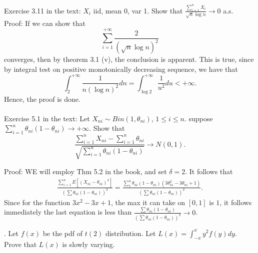 \documentclass[11pt]{article} \pagestyle{plain}
\def\beq{\begin{equation}}
\def\eeq{\end{equation}}
\begin{document}
\noindent Exercise 3.11 in the text: $X_{i}$ iid, mean 0, var 1. Show that $\frac{\sum_{i=1}^{n}X_{i}}{\sqrt{n}\log{n}} \to 0$ a.s.\\

\noindent Proof: If we can show that \beq \sum_{i=1}^{+\infty}\frac{2}{(\sqrt{n}\log{n})^{2}}\eeq converges, then by theorem 3.1 (v), the conclusion is apparent. This is true, since by integral test on positive monotonically decreasing sequence, we have that 
\beq \int_{2}^{+\infty}\frac{1}{n(\log{n})^{2}}dn = \int_{\log{2}}^{+\infty}\frac{1}{u^{2}}du< +\infty.\eeq
Hence, the proof is done.\\\\

\noindent Exercise 5.1 in the text: Let $X_{ni}\sim Bin(1,\theta_{ni})$, $1\leq i\leq n$. suppose $\sum_{i=1}^{n}\theta_{ni}(1-\theta_{ni})\to +\infty$. Show that 
\beq \frac{\sum_{i=1}^{n}X_{ni}-\sum_{i=1}^{n}\theta_{ni}}{\sqrt{\sum_{i=1}^{n}\theta_{ni}(1-\theta_{ni})}}\to N(0,1).\eeq 

\noindent Proof: WE will employ Thm 5.2 in the book, and set $\delta = 2$. It follows that 
\begin{align*} \frac{\sum_{i=1}^{n}E[(X_{ni}-\theta_{ni})^{4}]}{(\sum \theta_{ni}(1-\theta_{ni}))^{2}} = \frac{\sum_{1}^{n}\theta_{ni}(1-\theta_{ni})(3\theta_{ni}^{2}-3\theta_{ni}+1)}{(\sum \theta_{ni}(1-\theta_{ni}))^{2}}.\end{align*}
Since for the function $3x^{2}-3x+1$, the max it can take on $[0,1]$ is $1$, it follows immediately the last equation is less than $\frac{\sum \theta_{ni}(1-\theta_{ni})}{(\sum \theta_{ni}(1-\theta_{ni}))^{2}}\to 0$.


. Let $f(x)$ be the pdf of $t(2)$ distribution. Let $L(x) = \int_{-x}^{x}y^{2}f(y)dy$. Prove that $L(x)$ is slowly varying. 
\end{document}
